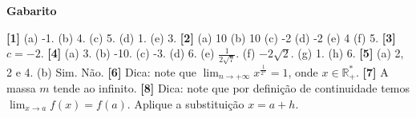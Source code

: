 \documentclass[12pt,a4paper]{article}
\begin{document}
\begin{center}
  \textbf{Gabarito}
\end{center}

\textbf{[1]} (a) -1. (b) 4. (c) 5. (d) 1. (e) 3. 
\textbf{[2]} (a) 10 (b) 10 (c) -2 (d) -2 (e) 4 (f) 5. 
\textbf{[3]} $c=-2$. 
\textbf{[4]} (a) 3. (b) -10. (c) -3. (d) 6. 
(e) $\frac{1}{2\sqrt{7}}$. (f) $-2\sqrt{2}$. 
(g) 1. (h) 6. 
\textbf{[5]} (a) 2, 2 e 4. (b) Sim. Não.
\textbf{[6]} Dica: note que $\displaystyle \lim_{n\to +\infty} x^\frac{1}{2^n} = 1$, onde $x\in\mathbb{R}_+^*$. 
\textbf{[7]} A massa $m$ tende ao infinito. 
\textbf{[8]} Dica: note que por definição de continuidade temos $\displaystyle \lim_{x\to a} f(x) = f(a)$. Aplique 
a substituição $x = a + h$. 
\end{document}
